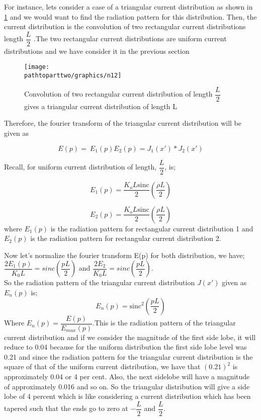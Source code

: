 For instance, lets consider a case of a triangular current distribution as shown in \ref{fig:n13} and we would want to find the radiation pattern for this distribution. Then, the current distribution is the convolution of two rectangular current distributions length $\dfrac{L}{2}$ .The two rectangular current distributions are uniform current distributions and we have consider it in the previous section
\begin{figure}[h]
\centering
\texttt{[image: \\pathtoparttwo/graphics/n12]}
\caption{Convolution of two rectangular current distribution of length $\dfrac{L}{2}$ gives a triangular current distribution of length L}
\label{fig:n13}
\end{figure}

Therefore, the fourier transform of the triangular current distribution will be given as

\begin{equation*}
E(p) =  \ E_1(p) E_{2}(p) = J_{1}(x') * J_{2}(x')
\end{equation*}

Recall, for uniform current distribution of length, $\dfrac{L}{2}$, is;

$$
E_{1}(p) = \dfrac{K_{o}L\text{sinc}}{2} \left(\dfrac{\rho L}{2}\right)$$

$$
E_{2}(p) = \dfrac{K_{o}L\text{sinc}}{2} \left(\dfrac{\rho L}{2}\right)$$
where $E_{1}(p)$ is the radiation pattern for rectangular current distribution 1
and $E_2(p)$ is the radiation pattern for rectangular current distribution 2.

Now let's normalize the fourier transform E(p) for both distribution, we have;\\
$\dfrac{2E_1(p)}{K_0L} = sinc(\dfrac{pL}{2})$ and $\dfrac{2E_2}{K_0L} = sinc(\dfrac{pL}{2})$.\\
So the radiation pattern of the triangular current distribution $J(x')$ given as $E_n(p)$ is;
\begin{equation}
E_n(p) = \text{sinc}^2\left(\dfrac{pL}{2}\right)
\end{equation}  
Where $E_n(p) = \dfrac{E(p)}{E_{max}(p)}$.This is the radiation pattern of the triangular current distribution and if we consider the magnitude of the first side lobe, it will reduce to 0.04 because for the uniform distribution the first side lobe level was 0.21 and since the radiation pattern for the triangular current distribution is the square of that of the uniform current distribution, we have that $(0.21)^2$ is approximately 0.04 or 4 per cent. Also, the next sidelobe will have a magnitude of approximately 0.016 and so on. So the triangular distribution will give a side lobe of 4 percent which is like considering a current distribution which has been tapered such that the ends go to zero at $-\dfrac{L}{2}$ and $\dfrac{L}{2}$.

